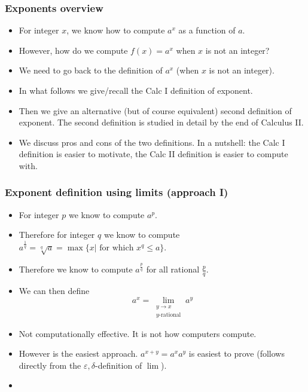 \begin{frame}
\frametitle{Exponents overview}
\begin{itemize}
\item<1-> For integer $x$, we know how to compute $a^{x}$ as a function of $a$. 
\item<2-> However, how do we compute $f(x)=a^x$ when $x$ is not an integer?
\item<3-> We need to go back to the definition of $a^x$ (when $x$ is not an integer).
\item<4-> In what follows we give/recall the Calc I definition of exponent.
\item<5-> Then we give an alternative (but of course equivalent) second definition of exponent. The second definition is studied in detail by the end of Calculus II. 
\item<6-> We discuss pros and cons of the two definitions. In a nutshell: the Calc I definition is easier to motivate, the Calc II definition is easier to compute with.
\end{itemize}
\end{frame}
\begin{frame}
\frametitle{Exponent definition using limits (approach I)}
\begin{itemize}
\item<1-> For integer $p$ we know to compute $a^p$.
\item<2-> Therefore for integer $q$ we know to compute $a^{\frac{1}{q}}= \sqrt[q]{a}=\max\{x|\text{~for~which~} x^q\leq a\}$.
\item<3-> Therefore we know to compute $a^{\frac{p}{q}}$ for all rational $\frac{p}{q}$.
\item<4-> We can then define
\[
a^x = \lim\limits_{\substack{y \to x \\ y\text{-rational}}} a^y 
\]
\item<5-> Not computationally effective. It is not how computers compute.
\item<6-> However is the easiest approach. $a^{x+y}=a^xa^y$ is easiest to prove (follows directly from the $\varepsilon, \delta$-definition of $\lim$).
\item<7->
\end{itemize}
\end{frame}
